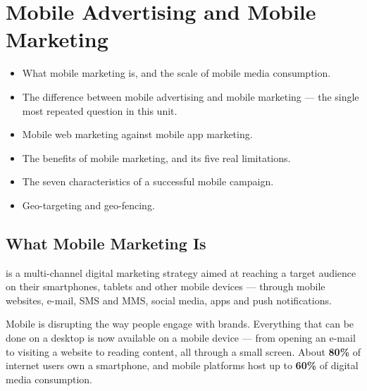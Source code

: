 
\chapter{Mobile Advertising and Mobile Marketing}


\begin{learningoutcomes}
\begin{itemize}
\item What mobile marketing is, and the scale of mobile media consumption.
\item The difference between mobile advertising and mobile marketing --- the
      single most repeated question in this unit.
\item Mobile web marketing against mobile app marketing.
\item The benefits of mobile marketing, and its five real limitations.
\item The seven characteristics of a successful mobile campaign.
\item Geo-targeting and geo-fencing.
\end{itemize}
\end{learningoutcomes}

\section{What Mobile Marketing Is}

\begin{definitionbox}
 is a multi-channel digital
marketing strategy aimed at reaching a target audience on their smartphones,
tablets and other mobile devices --- through mobile websites, e-mail, SMS and
MMS, social media, apps and push notifications.
\end{definitionbox}

Mobile is disrupting the way people engage with brands. Everything that can be
done on a desktop is now available on a mobile device --- from opening an e-mail
to visiting a website to reading content, all through a small screen. About
\textbf{80\%} of internet users own a smartphone, and mobile platforms host up to
\textbf{60\%} of digital media consumption.

